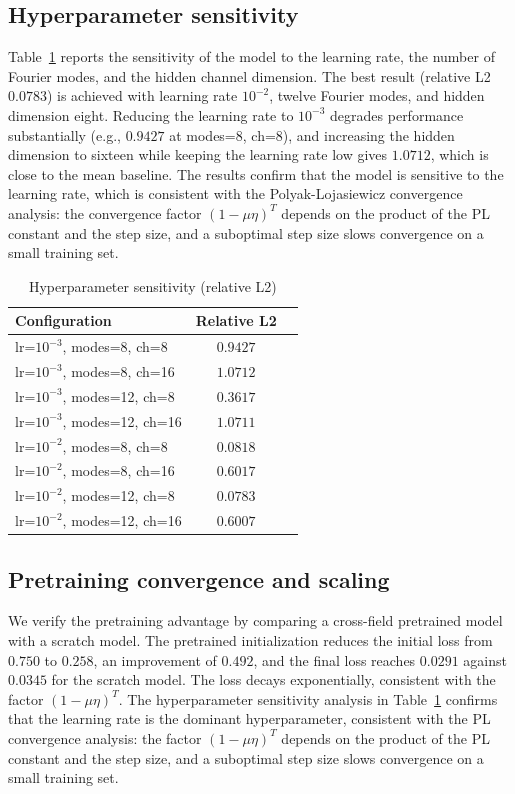 \documentclass[preprint,12pt]{elsarticle}
\begin{document}
\subsection{Hyperparameter sensitivity}
Table~\ref{tab:m7} reports the sensitivity of the model to the learning rate, the number of Fourier modes, and the hidden channel dimension. The best result (relative L2 $0.0783$) is achieved with learning rate $10^{-2}$, twelve Fourier modes, and hidden dimension eight. Reducing the learning rate to $10^{-3}$ degrades performance substantially (e.g., $0.9427$ at modes=8, ch=8), and increasing the hidden dimension to sixteen while keeping the learning rate low gives $1.0712$, which is close to the mean baseline. The results confirm that the model is sensitive to the learning rate, which is consistent with the Polyak-Lojasiewicz convergence analysis: the convergence factor $(1-\mu\eta)^T$ depends on the product of the PL constant and the step size, and a suboptimal step size slows convergence on a small training set.

\begin{table}[t]
\centering
\small
\caption{Hyperparameter sensitivity (relative L2)}
\label{tab:m7}
\begin{tabular}{lcc}
\toprule
Configuration & Relative L2 \\
\midrule
lr=$10^{-3}$, modes=8, ch=8 & $0.9427$ \\
lr=$10^{-3}$, modes=8, ch=16 & $1.0712$ \\
lr=$10^{-3}$, modes=12, ch=8 & $0.3617$ \\
lr=$10^{-3}$, modes=12, ch=16 & $1.0711$ \\
lr=$10^{-2}$, modes=8, ch=8 & $0.0818$ \\
lr=$10^{-2}$, modes=8, ch=16 & $0.6017$ \\
lr=$10^{-2}$, modes=12, ch=8 & $0.0783$ \\
lr=$10^{-2}$, modes=12, ch=16 & $0.6007$ \\
\bottomrule
\end{tabular}
\end{table}

\subsection{Pretraining convergence and scaling}
We verify the pretraining advantage by comparing a cross-field pretrained model with a scratch model. The pretrained initialization reduces the initial loss from $0.750$ to $0.258$, an improvement of $0.492$, and the final loss reaches $0.0291$ against $0.0345$ for the scratch model. The loss decays exponentially, consistent with the factor $(1-\mu\eta)^T$. The hyperparameter sensitivity analysis in Table~\ref{tab:m7} confirms that the learning rate is the dominant hyperparameter, consistent with the PL convergence analysis: the factor $(1-\mu\eta)^T$ depends on the product of the PL constant and the step size, and a suboptimal step size slows convergence on a small training set.
\end{document}
